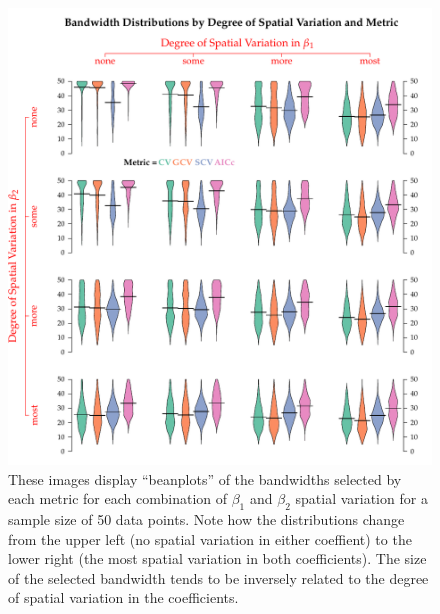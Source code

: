 \documentclass{article}\usepackage{graphicx, color}
\begin{document}
\begin{figure}
\includegraphics{figure/bandwidthsSS50bySpatVar.pdf}
\caption{These images display ``beanplots'' of the bandwidths selected by each metric for each combination of $\beta _1$ and $\beta _2$ spatial variation for a sample size of 50 data points. Note how the distributions change from the upper left (no spatial variation in either coeffient) to the lower right (the most spatial variation in both coefficients). The size of the selected bandwidth tends to be inversely related to the degree of spatial variation in the coefficients.}
\label{fig:bandwidthsSS50bySpatVar}
\end{figure}
\end{document}
